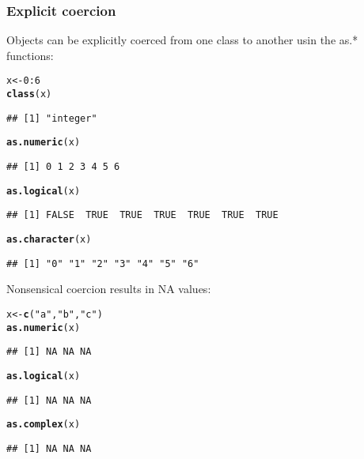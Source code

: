 \documentclass[10pt,a4paper,twoside]{article}\usepackage[]{graphicx}\usepackage[]{xcolor}
\makeatletter
\newcommand{\hlnum}[1]{\textcolor[rgb]{0.686,0.059,0.569}{#1}}%
\newcommand{\hlsng}[1]{\textcolor[rgb]{0.192,0.494,0.8}{#1}}%
\newcommand{\hlopt}[1]{\textcolor[rgb]{0,0,0}{#1}}%
\newcommand{\hldef}[1]{\textcolor[rgb]{0.345,0.345,0.345}{#1}}%
\newcommand{\hlkwb}[1]{\textcolor[rgb]{0.69,0.353,0.396}{#1}}%
\newcommand{\hlkwd}[1]{\textcolor[rgb]{0.737,0.353,0.396}{\textbf{#1}}}%
\newenvironment{kframe}{%
 \def\at@end@of@kframe{}%
 \ifinner\ifhmode%
  \def\at@end@of@kframe{\end{minipage}}%
  \begin{minipage}{\columnwidth}%
 \fi\fi%
 \def\FrameCommand##1{\hskip\@totalleftmargin \hskip-\fboxsep
 \colorbox{shadecolor}{##1}\hskip-\fboxsep
     \hskip-\linewidth \hskip-\@totalleftmargin \hskip\columnwidth}%
 \MakeFramed {\advance\hsize-\width
   \@totalleftmargin\z@ \linewidth\hsize
   \@setminipage}}%
 {\par\unskip\endMakeFramed%
 \at@end@of@kframe}
\newenvironment{knitrout}{}{} %
\makeatother
\begin{document}
\subsubsection{Explicit coercion}

Objects can be explicitly coerced from one class to another usin the as.* functions:

\begin{knitrout}
\color{fgcolor}\begin{kframe}
\begin{alltt}
\hldef{x} \hlkwb{<-} \hlnum{0}\hlopt{:}\hlnum{6}
\hlkwd{class}\hldef{(x)}
\end{alltt}
\begin{verbatim}
## [1] "integer"
\end{verbatim}
\begin{alltt}
\hlkwd{as.numeric}\hldef{(x)}
\end{alltt}
\begin{verbatim}
## [1] 0 1 2 3 4 5 6
\end{verbatim}
\begin{alltt}
\hlkwd{as.logical}\hldef{(x)}
\end{alltt}
\begin{verbatim}
## [1] FALSE  TRUE  TRUE  TRUE  TRUE  TRUE  TRUE
\end{verbatim}
\begin{alltt}
\hlkwd{as.character}\hldef{(x)}
\end{alltt}
\begin{verbatim}
## [1] "0" "1" "2" "3" "4" "5" "6"
\end{verbatim}
\end{kframe}
\end{knitrout}

Nonsensical coercion results in NA values:

\begin{knitrout}
\color{fgcolor}\begin{kframe}
\begin{alltt}
\hldef{x} \hlkwb{<-} \hlkwd{c}\hldef{(}\hlsng{"a"}\hldef{,} \hlsng{"b"}\hldef{,} \hlsng{"c"}\hldef{)}
\hlkwd{as.numeric}\hldef{(x)}
\end{alltt}


{\ttfamily\noindent\color{warningcolor}{\#\# Warning: NAs introduced by coercion}}\begin{verbatim}
## [1] NA NA NA
\end{verbatim}
\begin{alltt}
\hlkwd{as.logical}\hldef{(x)}
\end{alltt}
\begin{verbatim}
## [1] NA NA NA
\end{verbatim}
\begin{alltt}
\hlkwd{as.complex}\hldef{(x)}
\end{alltt}


{\ttfamily\noindent\color{warningcolor}{\#\# Warning: NAs introduced by coercion}}\begin{verbatim}
## [1] NA NA NA
\end{verbatim}
\end{kframe}
\end{knitrout}
\end{document}
